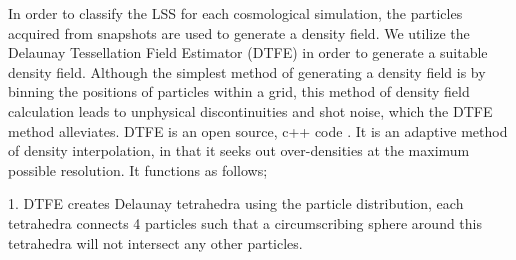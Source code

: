 \documentclass[a4paper,fleqn,usenatbib]{mnras}
\begin{document}
In order to classify the LSS for each cosmological simulation, the particles acquired from snapshots are used to generate a density field. We utilize the Delaunay Tessellation Field Estimator (DTFE)  in order to generate a suitable density field. Although the simplest method of generating a density field is by binning the positions of particles within a grid, this method of density field calculation leads to unphysical discontinuities and shot noise, which the DTFE method alleviates.
DTFE is an open source, c++ code \citep{Shaap_00,Weygaert_09,Cautun_11}. It is an adaptive method of density interpolation, in that it seeks out over-densities at the maximum possible resolution. It functions as follows;

1. DTFE creates Delaunay tetrahedra using the particle distribution, each tetrahedra connects 4 particles such that a circumscribing sphere around this tetrahedra will not intersect any other particles. 
\end{document}
